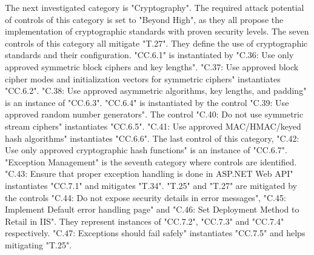 \newline
The next investigated category is "Cryptography". The required attack potential of controls of this category is set to "Beyond High", as they all propose the implementation of cryptographic standards with proven security levels. The seven controls of this category all mitigate "T.27". They define the use of cryptographic standards and their configuration. "CC.6.1" is instantiated by "C.36: Use only approved symmetric block ciphers and key lengths". "C.37: Use approved block cipher modes and initialization vectors for symmetric ciphers" instantiates "CC.6.2". "C.38: Use approved asymmetric algorithms, key lengths, and padding" is an instance of "CC.6.3". "CC.6.4" is instantiated by the control "C.39: Use approved random number generators". The control "C.40: Do not use symmetric stream ciphers" instantiates "CC.6.5". "C.41: Use approved MAC/HMAC/keyed hash algorithms" instantiates "CC.6.6". The last control of this category, "C.42: Use only approved cryptographic hash functions" is an instance of "CC.6.7". \\
\newline
"Exception Management" is the seventh category where controls are identified. "C.43: Ensure that proper exception handling is done in ASP.NET Web API" instantiates "CC.7.1" and mitigates "T.34". "T.25" and "T.27" are mitigated by the controls "C.44: Do not expose security details in error messages", "C.45: Implement Default error handling page" and "C.46: Set Deployment Method to Retail in IIS". They represent instances of "CC.7.2", "CC.7.3" and "CC.7.4" respectively. "C.47: Exceptions should fail safely" instantiates "CC.7.5" and helps mitigating "T.25".\\
\newline
